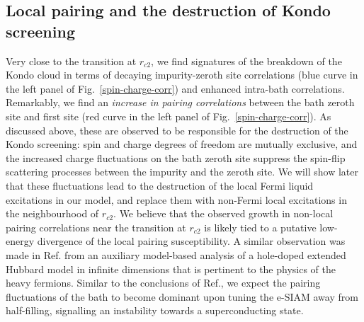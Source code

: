 \documentclass{iopart}
\begin{document}
\subsection{Local pairing and the destruction of Kondo screening} 
Very close to the transition at \(r_{c2}\), we find signatures of the breakdown of the Kondo cloud in terms of decaying impurity-zeroth site correlations (blue curve in the left panel of Fig.~\eqref{spin-charge-corr}) and enhanced intra-bath correlations. Remarkably, we find an {\it increase in pairing correlations} between the bath zeroth site and first site (red curve in the left panel of Fig.~\eqref{spin-charge-corr}). As discussed above, these are observed to be responsible for the destruction of the Kondo screening: spin and charge degrees of freedom are mutually exclusive, and the increased charge fluctuations on the bath zeroth site suppress the spin-flip scattering processes between the impurity and the zeroth site. We will show later that these fluctuations lead to the destruction of the local Fermi liquid excitations in our model, and replace them with non-Fermi local excitations in the neighbourhood of \(r_{c2}\).
We believe that the observed growth in non-local pairing correlations near the transition at \(r_{c2}\) is likely tied to a putative low-energy divergence of the local pairing susceptibility. A similar observation was made in Ref.\cite{si_kotliar_1993} from an auxiliary model-based analysis of a hole-doped extended Hubbard model in infinite dimensions that is pertinent to the physics of the heavy fermions. Similar to the conclusions of Ref.\cite{si_kotliar_1993}, we expect the pairing fluctuations of the bath to become dominant upon tuning the e-SIAM away from half-filling, signalling an instability towards a superconducting state.
\end{document}
